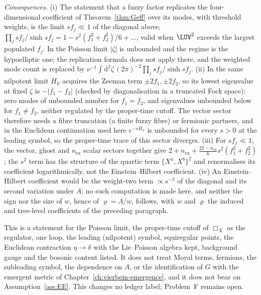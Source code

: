 \emph{Consequences.} (i) The statement that a fuzzy factor replicates the four-dimensional coefficient of Theorem~\ref{thm:Geff} over its modes, with threshold weights, is the limit \(sf_j\ll1\) of the diagonal above, \(\prod_j sf_j/\sinh sf_j=1-s^2(f_1^2+f_2^2)/6+\dots\), valid when \(\LUV^2\) exceeds the largest populated \(f_j\). In the Poisson limit \(|\zeta|\) is unbounded and the regime is the hypoelliptic one; the replication formula does not apply there, and the weighted mode count is replaced by \(\nu^{-1}\int\mathrm d^2\zeta\,(2\pi)^{-2}\prod_j sf_j/\sinh sf_j\). (ii) In the same nilpotent limit \(H_V\) acquires the Zeeman term \(\pm2f_1,\pm2f_2\), so its lowest eigenvalue at fixed \(\zeta\) is \(-|f_1-f_2|\) (checked by diagonalisation in a truncated Fock space): zero modes of unbounded number for \(f_1=f_2\), and eigenvalues unbounded below for \(f_1\ne f_2\), neither regulated by the proper-time cutoff. The vector sector therefore needs a fibre truncation (a finite fuzzy fibre) or fermionic partners, and in the Euclidean continuation used here \(e^{-sH_V}\) is unbounded for every \(s>0\) at the leading symbol, so the proper-time trace of this sector diverges. (iii) For \(sf_j\ll1\), the vector, ghost and \(n_{\mathrm{ex}}\) scalar sectors together give \(2+n_{\mathrm{ex}}+\tfrac{22-n_{\mathrm{ex}}}{6}s^2(f_1^2+f_2^2)\); the \(s^2\) term has the structure of the quartic term \(\{X^a,X^b\}^2\) and renormalises its coefficient logarithmically, not the Einstein--Hilbert coefficient. (iv) An Einstein--Hilbert coefficient would be the weight-two term \(\propto s^{-3}\) of the diagonal and its second variation under \(A\); no such computation is made here, and neither the sign nor the size of \(w\), hence of \(\varrho=\Lambda/w\), follows, with \(w\) and \(\varrho\) the induced and tree-level coefficients of the preceding paragraph.



This is a statement for the Poisson limit, the proper-time cutoff of \(\Box_X\) as the regulator, one loop, the leading (nilpotent) symbol, equiregular points, the Euclidean contraction \(\eta\to\delta\) with the Lie--Poisson algebra kept, background gauge and the bosonic content listed. It does not treat Moyal terms, fermions, the subleading symbol, the dependence on \(A\), or the identification of \(G\) with the emergent metric of Chapter~\ref{ch:vierbein-emergence}, and it does not bear on Assumption~\ref{ass:EE}. This changes no ledger label; Problem~F remains open.





